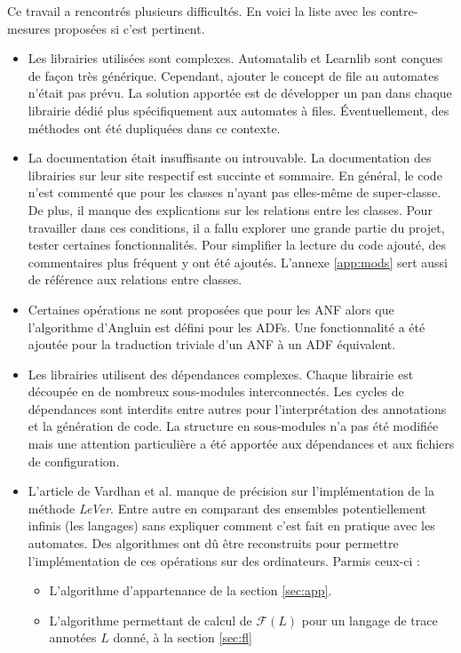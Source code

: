 Ce travail a rencontrés plusieurs difficultés. En voici la liste avec les contre-mesures proposées si c'est pertinent.

\begin{itemize}
  \item Les librairies utilisées sont complexes. Automatalib et Learnlib sont conçues de façon très générique. Cependant, ajouter le concept de file au automates n'était pas prévu. La solution apportée est de développer un pan dans chaque librairie dédié plus spécifiquement aux automates à files. Éventuellement, des méthodes ont été dupliquées dans ce contexte.
  \item La documentation était insuffisante ou introuvable. La documentation des librairies sur leur site respectif est succinte et sommaire. En général, le code n'est commenté que pour les classes n'ayant pas elles-même de super-classe. De plus, il manque des explications sur les relations entre les classes. Pour travailler dans ces conditions, il a fallu explorer une grande partie du projet, tester certaines fonctionnalités. Pour simplifier la lecture du code ajouté, des commentaires plus fréquent y ont été ajoutés. L'annexe \ref{app:mods} sert aussi de référence aux relations entre classes.
  \item Certaines opérations ne sont proposées que pour les ANF alors que l'algorithme d'Angluin est défini pour les ADFs. Une fonctionnalité a été ajoutée pour la traduction triviale d'un ANF à un ADF équivalent.
  \item Les librairies utilisent des dépendances complexes. Chaque librairie est découpée en de nombreux sous-modules interconnectés. Les cycles de dépendances sont interdits entre autres pour l'interprétation des annotations et la génération de code. La structure en sous-modules n'a pas été modifiée mais une attention particulière a été apportée aux dépendances et aux fichiers de configuration.
  \item L'article de Vardhan et al.\cite{Vardhan04} manque de précision sur l'implémentation de la méthode \emph{LeVer}. Entre autre en comparant des ensembles potentiellement infinis (les langages) sans expliquer comment c'est fait en pratique avec les automates. Des algorithmes ont dû être reconstruits pour permettre l'implémentation de ces opérations sur des ordinateurs. Parmis ceux-ci :
  \begin{itemize}
    \item L'algorithme d'appartenance de la section \ref{sec:app}.
    \item L'algorithme permettant de calcul de $\mathcal{F}(L)$ pour un langage de trace annotées $L$ donné, à la section \ref{sec:fl}

\end{itemize}
\end{itemize}
